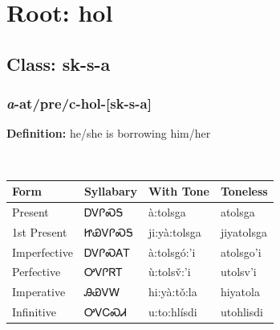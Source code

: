 \needspace{4in}
\section*{Root: hol}
\nopagebreak
{}
\needspace{3in}
\subsection*{Class: sk-s-a}
\nopagebreak
\needspace{2in}
\subsubsection*{\textit{a}{-}at/pre/c{-}\textbf{hol}{-}[sk-s-a]}
\nopagebreak
\textbf{Definition: } he/she is borrowing him/her
\\[0.5em]
\begin{tabularx}{\textwidth}{l X X X}%
\toprule%
\textbf{Form}&\textbf{Syllabary}&\textbf{With Tone}&\textbf{Toneless}\\%
\midrule%
Present&ᎠᏙᎵᏍᎦ&à:tolsga&atolsga\\%
1st Present&ᏥᏯᏙᎵᏍᎦ&ji:yà:tolsga&jiyatolsga\\%
Imperfective&ᎠᏙᎵᏍᎪᎢ&à:tolsgó:’i&atolsgo’i\\%
Perfective&ᎤᏙᎵᏒᎢ&ù:tolsv̌:’i&utolsv’i\\%
Imperative&ᎯᏯᏙᎳ&hi:yà:tǒ:la&hiyatola\\%
Infinitive&ᎤᏙᏟᏍᏗ&u:to:hlísdi&utohlisdi\\%
\bottomrule%
\end{tabularx}
\\[1em]